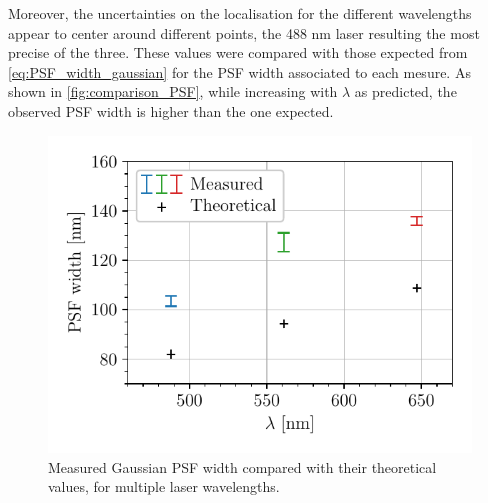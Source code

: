 %
Moreover, the uncertainties on the localisation for the different wavelengths appear to center around different points, the 488 nm laser resulting the most precise of the three.
These values were compared with those expected from \autoref{eq:PSF_width_gaussian} for the PSF width associated to each mesure.
As shown in \autoref{fig:comparison_PSF}, while increasing with $\lambda$ as predicted,
the observed PSF width is higher than the one expected.
\begin{figure}[htbp]
    \centering
    \vspace{-0.5cm}
    \includegraphics[scale=1]{figures/comparison_PSF.pdf}
    \caption{Measured Gaussian PSF width compared with their theoretical values, for multiple laser wavelengths.}
    \label{fig:comparison_PSF}
\end{figure}


